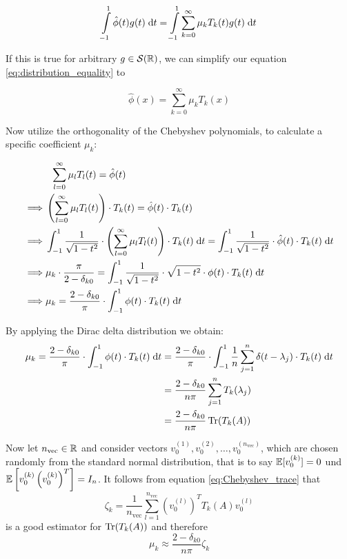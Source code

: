 \begin{equation} \label{eq:distribution_equality}
    \int \limits_{-1}^1 \hat{\phi}(t) g(t) \;\mathrm{d}t = \int \limits_{-1}^1 \sum_{k = 0}^{\infty} \mu_k T_k(t) g(t) \;\mathrm{d}t
\end{equation}

If this is true for arbitrary $g \in \mathcal{S}(\mathbb{R})$, we can simplify our equation \ref{eq:distribution_equality} to

\begin{equation} \label{eq:Chebyshev-Expansion}
    \hat{\phi}(x) = \sum_{k = 0}^{\infty} \mu_k T_k(x)
\end{equation}


Now utilize the orthogonality of the Chebyshev polynomials, to calculate a specific coefficient $\mu_k$:

\begin{align*}
    & \; \; \sum_{l = 0}^{\infty} \mu_l T_l(t) = \hat{\phi}(t) \\
    \implies & \left(\sum_{l = 0}^{\infty} \mu_l T_l(t)\right) \cdot T_k(t) = \hat{\phi}(t) \cdot T_k(t)\\
    \implies & \int_{-1}^1 \frac{1}{\sqrt{1 - t^2}} \cdot \left(\sum_{l = 0}^{\infty} \mu_l T_l(t)\right) \cdot T_k(t) \;\mathrm{d}t = \int_{-1}^1 \frac{1}{\sqrt{1 - t^2}} \cdot \hat{\phi}(t) \cdot T_k(t) \;\mathrm{d}t\\
    \implies & \mu_k \cdot \frac{\pi}{2 - \delta_{k0}} = \int_{-1}^1 \frac{1}{\sqrt{1 - t^2}} \cdot \sqrt{1 - t^2} \cdot \phi(t) \cdot T_k(t) \;\mathrm{d}t\\
    \implies & \mu_k = \frac{2 - \delta_{k0}}{\pi} \cdot \int_{-1}^1 \phi(t) \cdot T_k(t) \;\mathrm{d}t\\
\end{align*}

By applying the Dirac delta distribution we obtain:
\begin{align*}
    \mu_k = \frac{2 - \delta_{k0}}{\pi} \cdot \int_{-1}^1 \phi(t) \cdot T_k(t) \;\mathrm{d}t &= \frac{2 - \delta_{k0}}{\pi} \cdot \int_{-1}^1 \frac{1}{n} \sum_{j = 1}^n \delta(t - \lambda_j) \cdot T_k(t) \;\mathrm{d}t \\
    &= \frac{2 - \delta_{k0}}{n \pi} \sum_{j = 1}^n T_k(\lambda_j)\\
    &= \frac{2 - \delta_{k0}}{n \pi} \operatorname{Tr}(T_k(A))
\end{align*}

Now let $n_{\text{vec}} \in \mathbb{R}$ and consider vectors $v_0^{(1)}, v_0^{(2)}, \dots, v_0^{(n_{\text{vec}})}$,
which are chosen randomly from the standard normal distribution,
that is to say $\mathbb{E}[v_0^{(k)}] = 0$ und $\mathbb{E}\left[v_0^{(k)}\left(v_0^{(k)}\right)^T\right] = I_n$.
It follows from equation \ref{eq:Chebyshev_trace} that
\[
\zeta_k = \frac{1}{n_{\text{vec}}} \sum_{l = 1}^{n_{\text{vec}}} \left( v_0^{(l)} \right)^T T_k(A) v_0^{(l)}
\]
is a good estimator for $\operatorname{Tr}(T_k(A))$ and therefore
\[
\mu_k \approx \frac{2 - \delta_{k0}}{n \pi} \zeta_k
\]

